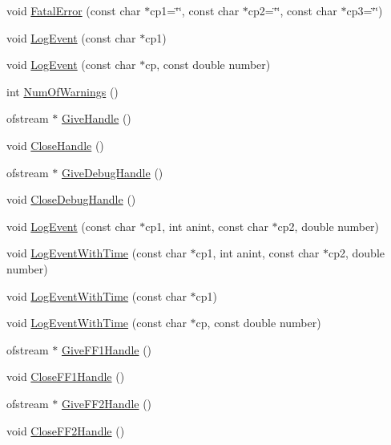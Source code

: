 \begin{DoxyCompactItemize}
\item 
void \hyperlink{classmessage_a858cde36543e084d30fcb2693ee08fdc}{FatalError} (const char $\ast$cp1=\char`\"{}\char`\"{}, const char $\ast$cp2=\char`\"{}\char`\"{}, const char $\ast$cp3=\char`\"{}\char`\"{})
\item 
void \hyperlink{classmessage_acd59708da958867b53d2fc740f5607fb}{LogEvent} (const char $\ast$cp1)
\item 
void \hyperlink{classmessage_ae578234ff0b329aa475c379a15aa2777}{LogEvent} (const char $\ast$cp, const double number)
\item 
int \hyperlink{classmessage_ad3c7bd4317ab5c92d1d9d822540ff72a}{NumOfWarnings} ()
\item 
ofstream $\ast$ \hyperlink{classmessage_a9c4d08163cff8ee8dba9eb8b6317a8b9}{GiveHandle} ()
\item 
void \hyperlink{classmessage_a8353517a95f66390d9e9add3276da11e}{CloseHandle} ()
\item 
ofstream $\ast$ \hyperlink{classmessage_a176f7e9a4dfa77ef53b3cf98e8ab77d6}{GiveDebugHandle} ()
\item 
void \hyperlink{classmessage_a5fa5bc2bad4c10edc4fa24527259a961}{CloseDebugHandle} ()
\item 
void \hyperlink{classmessage_a498bc2c5d2fb315b339f12ac47a702fb}{LogEvent} (const char $\ast$cp1, int anint, const char $\ast$cp2, double number)
\item 
void \hyperlink{classmessage_adbb11c1e5f2d24e132ed20812e67fadb}{LogEventWithTime} (const char $\ast$cp1, int anint, const char $\ast$cp2, double number)
\item 
void \hyperlink{classmessage_a9292720e75bec37fc568dfffbb02a68f}{LogEventWithTime} (const char $\ast$cp1)
\item 
void \hyperlink{classmessage_a5e553d7905bef50a91b8318445139033}{LogEventWithTime} (const char $\ast$cp, const double number)
\item 
ofstream $\ast$ \hyperlink{classmessage_a453ef3576d87c4927a6afc1f8f111d5e}{GiveFF1Handle} ()
\item 
void \hyperlink{classmessage_af45d625ae43381ebd81c13b0462fc7af}{CloseFF1Handle} ()
\item 
ofstream $\ast$ \hyperlink{classmessage_a4e0e2e4816d10ba57486c618e844d45c}{GiveFF2Handle} ()
\item 
void \hyperlink{classmessage_a19548e1e18c484e155ec7e91f6b647c6}{CloseFF2Handle} ()
\end{DoxyCompactItemize}


